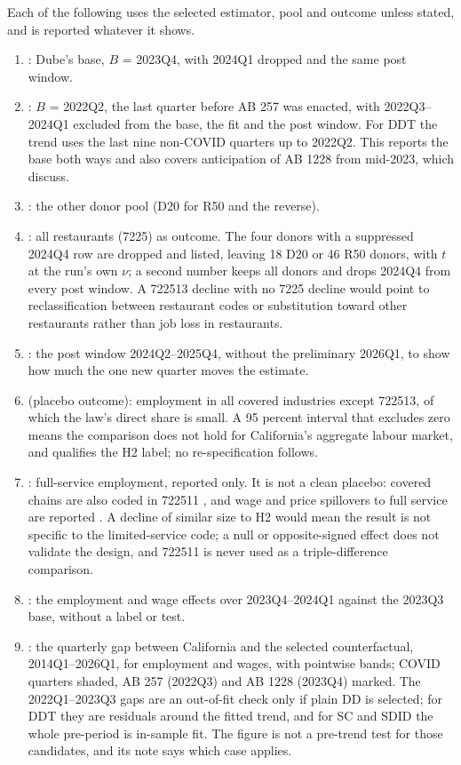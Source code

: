 Each of the following uses the selected estimator, pool and outcome unless stated, and is reported
whatever it shows.
\begin{enumerate}
  \item {}: Dube's base, $B$ = 2023Q4, with 2024Q1 dropped and the same post
        window.
  \item {}: $B$ = 2022Q2, the last quarter before AB 257 was enacted, with
        2022Q3--2024Q1 excluded from the base, the fit and the post window. For DDT the trend uses
        the last nine non-COVID quarters up to 2022Q2. This reports the base both ways and also
        covers anticipation of AB 1228 from mid-2023, which \citet{sosinskiy2026effects} discuss.
  \item {}: the other donor pool (D20 for R50 and the reverse).
  \item {}: all restaurants (7225) as outcome. The four donors with a suppressed 2024Q4
        row are dropped and listed, leaving 18 D20 or 46 R50 donors, with $t$ at the run's own
        $\nu$; a second number keeps all donors and drops 2024Q4 from every post window. A 722513
        decline with no 7225 decline would point to reclassification between restaurant codes or
        substitution toward other restaurants rather than job loss in restaurants.
  \item {}: the post window 2024Q2--2025Q4, without the preliminary 2026Q1,
        to show how much the one new quarter moves the estimate.
  \item {} (placebo outcome): employment in all covered industries except 722513,
        of which the law's direct share is small. A 95 percent interval that excludes zero means the
        comparison does not hold for California's aggregate labour market, and qualifies the H2
        label; no re-specification follows.
  \item {}: full-service employment, reported only. It is not a clean placebo:
        covered chains are also coded in 722511 \citep{melo2026covered}, and wage and price
        spillovers to full service are reported \citep{clemens2026prices}. A decline of similar size
        to H2 would mean the result is not specific to the limited-service code; a null or
        opposite-signed effect does not validate the design, and 722511 is never used as a
        triple-difference comparison.
  \item {}: the employment and wage effects over 2023Q4--2024Q1 against the 2023Q3
        base, without a label or test.
  \item {}: the quarterly gap between California and the selected counterfactual,
        2014Q1--2026Q1, for employment and wages, with pointwise bands; COVID quarters shaded, AB
        257 (2022Q3) and AB 1228 (2023Q4) marked. The 2022Q1--2023Q3 gaps are an out-of-fit check
        only if plain DD is selected; for DDT they are residuals around the fitted trend, and for SC
        and SDID the whole pre-period is in-sample fit. The figure is not a pre-trend test for those
        candidates, and its note says which case applies.
\end{enumerate}

